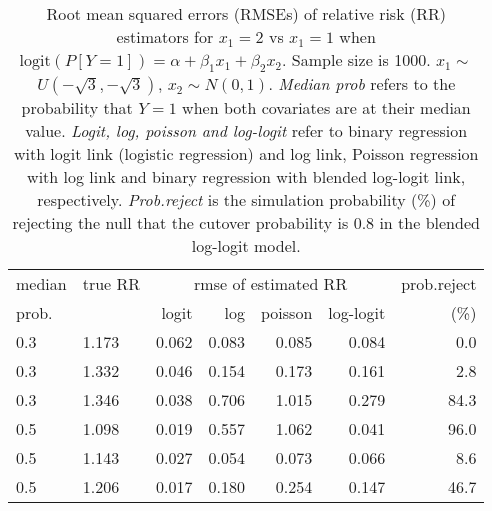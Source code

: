 \documentclass[12pt,a4paper]{article}
\begin{document}
\begin{table}[H] 
\small\sf\centering 
\caption{Root mean squared errors (RMSEs) of relative risk (RR) estimators for $x_1=2$ vs $x_1=1$ when $\mbox{logit}(P[Y=1])=\alpha+\beta_1 x_1 + \beta_2 x_2$. Sample size is 1000. $x_1 \sim $$U(-\sqrt{3},-\sqrt{3})$, $x_2 \sim N(0,1)$. {\it Median prob} refers to the probability that $Y=1$ when both covariates are at their median value. {\it Logit, log, poisson and log-logit} refer to binary regression with logit link (logistic regression) and log link, Poisson regression with log link and binary regression with blended log-logit link, respectively. {\it Prob.reject} is the simulation probability (\%) of rejecting the null that the cutover probability is $0.8$ in the blended log-logit model.} 
\begin{tabular}{llrrrrr} 
\toprule 
median & true RR & \multicolumn{4}{c}{rmse of estimated RR} & prob.reject \\ 
prob. & & logit & log & poisson & log-logit  & (\%) \\ \midrule 
0.3 & 1.173 & 0.062 & 0.083 & 0.085 & 0.084 &  0.0 \\  
0.3 & 1.332 & 0.046 & 0.154 & 0.173 & 0.161 &  2.8 \\  
0.3 & 1.346 & 0.038 & 0.706 & 1.015 & 0.279 & 84.3 \\  
0.5 & 1.098 & 0.019 & 0.557 & 1.062 & 0.041 & 96.0 \\  
0.5 & 1.143 & 0.027 & 0.054 & 0.073 & 0.066 &  8.6 \\  
0.5 & 1.206 & 0.017 & 0.180 & 0.254 & 0.147 & 46.7 \\  
\bottomrule 
\end{tabular} 
\end{table} 
\end{document}
